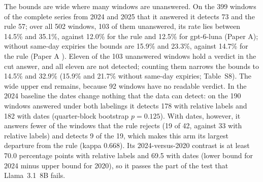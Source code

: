 The bounds are wide where many windows are unanswered. On the 399 windows of the complete series from 2024 and 2025 that it answered it detects 73 and the rule 57; over all 502 windows, 103 of them unanswered, its rate lies between 14.5\% and 35.1\%, against 12.0\% for the rule and 12.5\% for gpt-6-luna (Paper A); without same-day expiries the bounds are 15.9\% and 23.3\%, against 14.7\% for the rule (Paper A \cite{regan2026rerun}). Eleven of the 103 unanswered windows hold a verdict in the cut answer, and all eleven are not detected; counting them narrows the bounds to 14.5\% and 32.9\% (15.9\% and 21.7\% without same-day expiries; Table~S8). The wide upper end remains, because 92 windows have no readable verdict. In the 2024 baseline the dates change nothing that the data can detect: on the 190 windows answered under both labelings it detects 178 with relative labels and 182 with dates (quarter-block bootstrap $p=0.125$). With dates, however, it answers fewer of the windows that the rule rejects (19 of 42, against 33 with relative labels) and detects 9 of the 19, which makes this arm its largest departure from the rule (kappa 0.668). Its 2024-versus-2020 contrast is at least 70.0 percentage points with relative labels and 69.5 with dates (lower bound for 2024 minus upper bound for 2020), so it passes the part of the test that Llama~3.1~8B fails.

